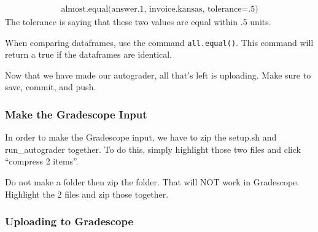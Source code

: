 \documentclass[
]{article}
\begin{document}
\[
\begin{aligned}
\text{almost.equal(answer.1, invoice.kansas, tolerance=.5)}
\end{aligned}
\] The tolerance is saying that these two values are equal within .5
units.

When comparing dataframes, use the command \texttt{all.equal()}. This
command will return a true if the dataframes are identical.

Now that we have made our autograder, all that's left is uploading. Make
sure to save, commit, and push.

\hypertarget{make-the-gradescope-input}{%
\subsubsection{Make the Gradescope
Input}\label{make-the-gradescope-input}}

In order to make the Gradescope input, we have to zip the setup.sh and
run\_autograder together. To do this, simply highlight those two files
and click ``compress 2 items''.

\begin{center}
\end{center}

Do not make a folder then zip the folder. That will NOT work in
Gradescope. Highlight the 2 files and zip those together.

\hypertarget{uploading-to-gradescope}{%
\subsubsection{Uploading to Gradescope}\label{uploading-to-gradescope}}
\end{document}
